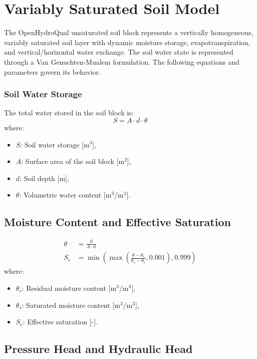 \documentclass[12pt]{report}
\begin{document}
\chapter{Variably Saturated Soil Model}

The OpenHydroQual unsaturated soil block represents a vertically homogeneous, variably saturated soil layer with dynamic moisture storage, evapotranspiration, and vertical/horizontal water exchange. The soil water state is represented through a Van Genuchten-Mualem formulation. The following equations and parameters govern its behavior.

\subsection{Soil Water Storage}

The total water stored in the soil block is:
\begin{equation}
S = A \cdot d \cdot \theta
\end{equation}
where:
\begin{itemize}
\item $S$: Soil water storage [m$^3$],
\item $A$: Surface area of the soil block [m$^2$],
\item $d$: Soil depth [m],
\item $\theta$: Volumetric water content [m$^3$/m$^3$].
\end{itemize}

\section{Moisture Content and Effective Saturation}

\begin{align}
\theta &= \frac{S}{A \cdot d} \\
S_e &= \min\left(\max\left(\frac{\theta - \theta_r}{\theta_s - \theta_r}, 0.001\right), 0.999\right)
\end{align}
where:
\begin{itemize}
\item $\theta_r$: Residual moisture content [m$^3$/m$^3$],
\item $\theta_s$: Saturated moisture content [m$^3$/m$^3$],
\item $S_e$: Effective saturation [-].
\end{itemize}

\section{Pressure Head and Hydraulic Head}
\end{document}
